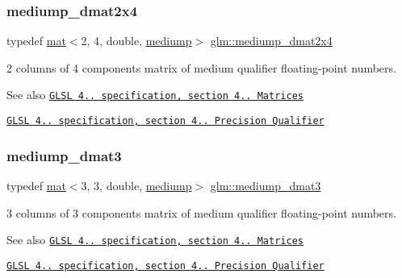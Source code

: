 \subsubsection{\texorpdfstring{mediump\+\_\+dmat2x4}{mediump\_dmat2x4}}
{\footnotesize\ttfamily typedef \hyperlink{structglm_1_1mat}{mat}$<$2, 4, double, \hyperlink{namespaceglm_a36ed105b07c7746804d7fdc7cc90ff25a6416f3ea0c9025fb21ed50c4d6620482}{mediump}$>$ \hyperlink{group__core__precision_ga20d1a647a3ef0083e306d026c77ac906}{glm\+::mediump\+\_\+dmat2x4}}

2 columns of 4 components matrix of medium qualifier floating-\/point numbers.

\begin{DoxySeeAlso}{See also}
\href{http://www.opengl.org/registry/doc/GLSLangSpec.4.20.8.pdf}{\tt G\+L\+SL 4.. specification, section 4.. Matrices} 

\href{http://www.opengl.org/registry/doc/GLSLangSpec.4.20.8.pdf}{\tt G\+L\+SL 4.. specification, section 4.. Precision Qualifier} 
\end{DoxySeeAlso}
\mbox{\label{group__core__precision_gaf1be0a781d33d2450a31e64e09d8d18f}} 
\subsubsection{\texorpdfstring{mediump\+\_\+dmat3}{mediump\_dmat3}}
{\footnotesize\ttfamily typedef \hyperlink{structglm_1_1mat}{mat}$<$3, 3, double, \hyperlink{namespaceglm_a36ed105b07c7746804d7fdc7cc90ff25a6416f3ea0c9025fb21ed50c4d6620482}{mediump}$>$ \hyperlink{group__core__precision_gaf1be0a781d33d2450a31e64e09d8d18f}{glm\+::mediump\+\_\+dmat3}}

3 columns of 3 components matrix of medium qualifier floating-\/point numbers.

\begin{DoxySeeAlso}{See also}
\href{http://www.opengl.org/registry/doc/GLSLangSpec.4.20.8.pdf}{\tt G\+L\+SL 4.. specification, section 4.. Matrices} 

\href{http://www.opengl.org/registry/doc/GLSLangSpec.4.20.8.pdf}{\tt G\+L\+SL 4.. specification, section 4.. Precision Qualifier} 
\end{DoxySeeAlso}
\mbox{\label{group__core__precision_gaefc11f3917dc7882f4399a47393792fa}} 
